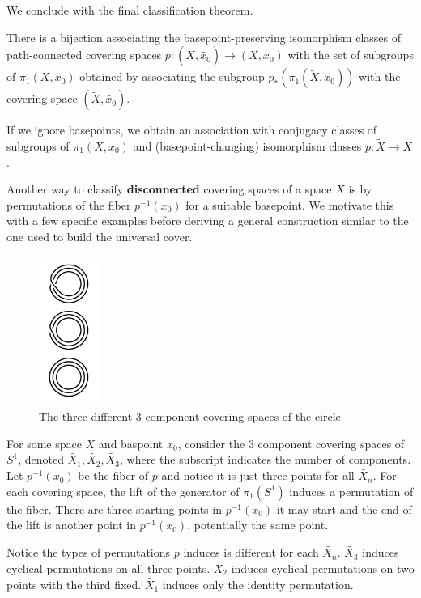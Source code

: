 \documentclass[10pt]{article}
\begin{document}
We conclude with the final classification theorem.

\begin{theorem}
	There is a bijection associating the basepoint-preserving isomorphism classes
	of path-connected covering spaces $p: (\tilde{X}, \tilde{x_0}) \to (X, x_0)$
	with the set of subgroups of $\pi_1(X, x_0)$ obtained by associating the
	subgroup $p_*(\pi_1(\tilde{X}, \tilde{x_0}))$ with the covering space
	$(\tilde{X}, \tilde{x_0})$. 

	If we ignore basepoints, we obtain an association with conjugacy classes of
	subgroups of $\pi_1(X, x_0)$ and (basepoint-changing) isomorphism classes $p:
	\tilde{X} \to X$.
\end{theorem}


Another way to classify \textbf{disconnected} covering spaces of a space $X$
is by permutations of the fiber $p^{-1}(x_0)$ for a suitable basepoint. We
motivate this with a few specific examples before deriving a general construction
similar to the one used to build the universal cover.

\begin{figure}[ht!]
\centering
\includegraphics[width=20mm]{3-component-covering-spaces-of-s1.png}
\caption{The three different 3 component covering spaces of the circle}
\end{figure}

\begin{note}
	For some space $X$ and baspoint $x_0$, consider the 3 component covering
	spaces of $S^1$, denoted $\tilde{X_1}, \tilde{X_2}, \tilde{X_3}$, where the
	subscript indicates the number of components. Let $p^{-1}(x_0)$ be the fiber
	of $p$ and notice it is just three points for all $\tilde{X_n}$. For each
	covering space, the lift of the generator of $\pi_1(S^1)$ induces a
	permutation of the fiber. There are three starting points in $p^{-1}(x_0)$ it
	may start and the end of the lift is another point in $p^{-1}(x_0)$,
	potentially the same point.

	Notice the types of permutations $p$ induces is different for each
	$\tilde{X_n}$. $\tilde{X_3}$ induces cyclical permutations on all three points.
	$\tilde{X_2}$ induces cyclical permutations on two points with the third
	fixed. $\tilde{X_1}$ induces only the identity permutation.
\end{note}
\end{document}
